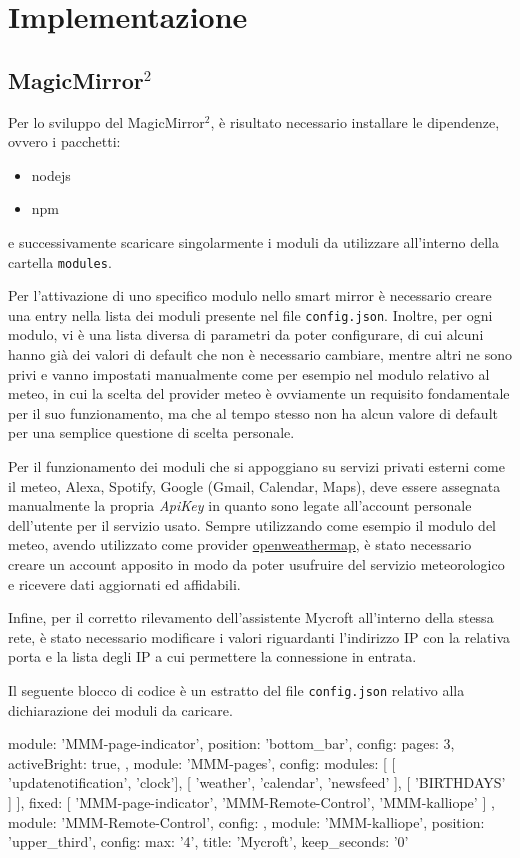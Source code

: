 \documentclass[12pt,a4paper]{article}
\begin{document}
\newpage
\section{Implementazione}

\subsection{MagicMirror$^2$}\label{magicmirror}

Per lo sviluppo del MagicMirror$^2$, \`e risultato necessario installare le dipendenze, ovvero i pacchetti:
\begin{itemize}
  \item nodejs
  \item npm
\end{itemize}
e successivamente scaricare singolarmente i moduli da utilizzare all'interno della cartella \verb|modules|.

Per l'attivazione
di uno specifico modulo nello smart mirror \`e necessario creare una entry nella lista dei moduli presente nel file
\verb|config.json|. Inoltre, per ogni modulo, vi \`e una lista diversa di parametri da poter configurare, di cui alcuni hanno
gi\`a dei valori di default che non \`e necessario cambiare, mentre altri ne sono privi e vanno impostati manualmente come per esempio
nel modulo relativo al meteo, in cui la scelta del provider meteo \`e ovviamente un requisito fondamentale per il suo funzionamento,
ma che al tempo stesso non ha alcun valore di default per una semplice questione di scelta personale.

Per il funzionamento dei moduli che si appoggiano su servizi privati esterni come il meteo, Alexa, Spotify, Google (Gmail,
Calendar, Maps), deve essere assegnata manualmente la propria \textit{ApiKey} in quanto sono legate all'account personale
dell'utente per il servizio usato. Sempre utilizzando come esempio il modulo del meteo, avendo utilizzato come provider
\href{https://openweathermap.org}{openweathermap}, \`e stato necessario creare un account apposito in modo da poter usufruire
del servizio meteorologico e ricevere dati aggiornati ed affidabili.

Infine, per il corretto rilevamento dell'assistente Mycroft all'interno della stessa rete, \`e stato necessario modificare
i valori riguardanti l'indirizzo IP con la relativa porta e la lista degli IP a cui permettere la connessione in entrata.

Il seguente blocco di codice \`e un estratto del file \verb|config.json| relativo alla dichiarazione dei moduli da caricare.
\begin{MyVerbatim}
{
  module: 'MMM-page-indicator',
  position: 'bottom_bar',
  config: {
    pages: 3,
    activeBright: true,
  }
},
{
  module: 'MMM-pages',
  config: {
     modules: [
      [ 'updatenotification', 'clock'],
      [ 'weather', 'calendar', 'newsfeed' ],
      [ 'BIRTHDAYS' ]
    ],
    fixed: [ 'MMM-page-indicator', 'MMM-Remote-Control', 'MMM-kalliope' ]
  }
},
{
  module: 'MMM-Remote-Control',
  config: {}
},
{
  module: 'MMM-kalliope',
  position: 'upper_third',
  config: {
    max: '4',
    title: 'Mycroft',
    keep_seconds: '0'
  }
}
\end{MyVerbatim}
\end{document}
